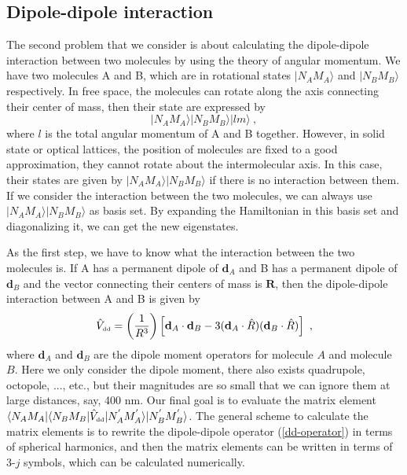 \subsection{Dipole-dipole interaction}
\label{sec::ddInteraction}

The second problem that we consider is about calculating the dipole-dipole interaction between two molecules by using the theory of angular momentum. 
We have two molecules A and B, which are in rotational states $|N_{A}M_{A}\rangle$ and $|N_{B}M_{B}\rangle$ 
respectively. In free space, the molecules can rotate along the axis connecting their center of mass, then their state 
are expressed by
\begin{equation}
|N_{A}M_{A}\rangle |N_{B}M_{B}\rangle |lm\rangle  \ , \nonumber
\end{equation}
where $l$ is the total angular momentum of A and B together. 
However, in solid state or optical lattices, the position of molecules are fixed to a good approximation, they cannot rotate about the intermolecular axis. In this case, their states are given by $|N_{A}M_{A}\rangle |N_{B}M_{B}\rangle$ if there is no interaction between them. If we consider the interaction between the two molecules, we can always use $|N_{A}M_{A}\rangle |N_{B}M_{B}\rangle$ as basis set. By expanding the Hamiltonian in this basis set and diagonalizing it, we can get the new eigenstates.

As the first step, we have to know what the interaction between the two molecules is. If A has a permanent dipole of $\mathbf{d}_{A}$ and B has a permanent dipole of $\mathbf{d}_{B}$ and the vector connecting their centers of mass is $\mathbf{R}$, then the dipole-dipole interaction between A and B is given by
\begin{equation}
\hat{V}_{\mbox{\tiny dd}} = \left(\frac{1}{R^3}\right)\left[ \mathbf{d}_{A}\cdot\mathbf{d}_{B}-3(\mathbf{d}_{A}\cdot\hat{R})(\mathbf{d}_{B}\cdot\hat{R})\right]  \ , \label{dd-operator}
\end{equation}
where $\mathbf{d}_{A}$ and $\mathbf{d}_{B}$ are the dipole moment operators for molecule $A$ and molecule 
$B$. 
Here we only consider the dipole moment, there also exists quadrupole, octopole, ..., etc., but their magnitudes are so small that we can ignore them at large distances, say, 400 nm. Our final goal is to evaluate the matrix element $\langle N_{A}M_{A}|\langle N_{B}M_{B} | \hat{V}_{\mbox{\tiny dd}}|N_{A}^{'}M_{A}^{'}\rangle |N_{B}^{'}M_{B}^{'}      \rangle$. The general scheme to calculate the matrix elements is to rewrite the dipole-dipole operator (\autoref{dd-operator}) in terms of spherical harmonics, and then the matrix elements can be written in terms of 3-$j$ symbols, which can be calculated numerically. 

